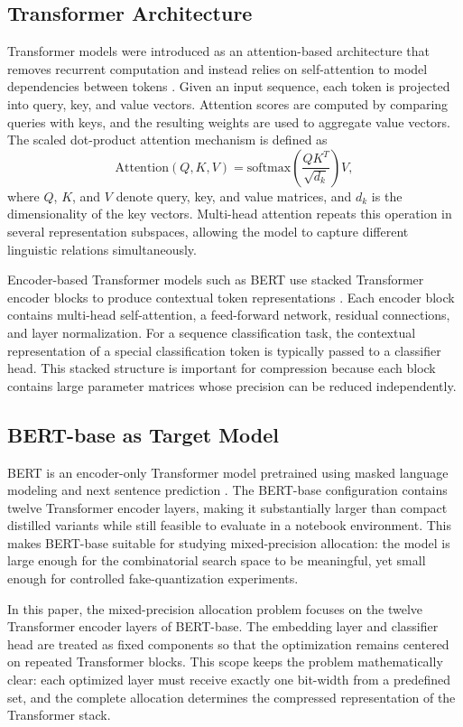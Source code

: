 \documentclass[conference]{IEEEtran}
\begin{document}
\subsection{Transformer Architecture}
Transformer models were introduced as an attention-based architecture that removes recurrent computation and instead relies on self-attention to model dependencies between tokens \cite{transformer}. Given an input sequence, each token is projected into query, key, and value vectors. Attention scores are computed by comparing queries with keys, and the resulting weights are used to aggregate value vectors. The scaled dot-product attention mechanism is defined as
\begin{equation}
\mathrm{Attention}(Q,K,V)=\mathrm{softmax}\left(\frac{QK^T}{\sqrt{d_k}}\right)V,
\end{equation}
where $Q$, $K$, and $V$ denote query, key, and value matrices, and $d_k$ is the dimensionality of the key vectors. Multi-head attention repeats this operation in several representation subspaces, allowing the model to capture different linguistic relations simultaneously.

Encoder-based Transformer models such as BERT use stacked Transformer encoder blocks to produce contextual token representations \cite{bert}. Each encoder block contains multi-head self-attention, a feed-forward network, residual connections, and layer normalization. For a sequence classification task, the contextual representation of a special classification token is typically passed to a classifier head. This stacked structure is important for compression because each block contains large parameter matrices whose precision can be reduced independently.

\subsection{BERT-base as Target Model}
BERT is an encoder-only Transformer model pretrained using masked language modeling and next sentence prediction \cite{bert}. The BERT-base configuration contains twelve Transformer encoder layers, making it substantially larger than compact distilled variants while still feasible to evaluate in a notebook environment. This makes BERT-base suitable for studying mixed-precision allocation: the model is large enough for the combinatorial search space to be meaningful, yet small enough for controlled fake-quantization experiments.

In this paper, the mixed-precision allocation problem focuses on the twelve Transformer encoder layers of BERT-base. The embedding layer and classifier head are treated as fixed components so that the optimization remains centered on repeated Transformer blocks. This scope keeps the problem mathematically clear: each optimized layer must receive exactly one bit-width from a predefined set, and the complete allocation determines the compressed representation of the Transformer stack.
\end{document}
